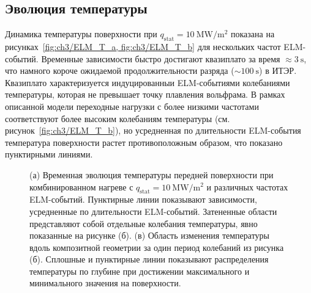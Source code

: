 \subsection{Эволюция температуры}\label{subsec:ch3/sec2/subsec3}
Динамика температуры поверхности при $q_{\mathrm{stat}}=\SI{10}{\mega\watt\per\meter\squared}$ показана на рисунках~\cref{fig:ch3/ELM_T_a, fig:ch3/ELM_T_b} для нескольких частот ELM-событий. Временные зависимости быстро достигают квазиплато за время $\approx\SI{3}{\second}$, что намного короче ожидаемой продолжительности разряда ($\sim\SI{100}{\second}$) в ИТЭР. Квазиплато характеризуется индуцированныи ELM-событиями колебаниями температуры, которая не превышает точку плавления вольфрама. В рамках описанной модели переходные нагрузки с более низкими частотами соответствуют более высоким колебаниям температуры (см. рисунок~\cref{fig:ch3/ELM_T_b}), но усредненная по длительности ELM-события температура поверхности растет противоположным образом, что показано пунктирными линиями.

\begin{figure}[ht]
	\caption{(а) Временная эволюция температуры передней поверхности при комбинированном нагреве с $q_{\mathrm{stat}}=\SI{10}{\mega\watt\per\meter\squared}$ и различных частотах ELM-событий. Пунктирные линии показывают зависимости, усредненные по длительности ELM-событий. Затененные области представляют собой отдельные колебания температуры, явно показанные на рисунке (б). (в) Область изменения температуры вдоль композитной геометрии за один период колебаний из рисунка (б). Сплошные и пунктирные линии показывают распределения температуры по глубине при достижении максимального и минимального значения на поверхности.}
\end{figure}

